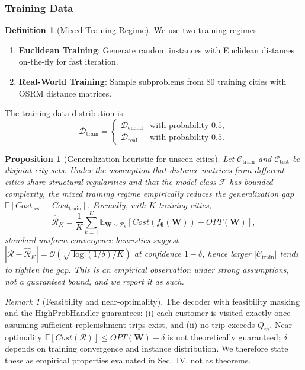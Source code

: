 \documentclass[journal,twoside,web]{ieeecolor}
\newtheorem{proposition}[theorem]{Proposition}
\theoremstyle{definition}
\newtheorem{definition}[theorem]{Definition}
\theoremstyle{remark}
\newtheorem{remark}[theorem]{Remark}
\theoremstyle{definition}
\begin{document}
\subsubsection{Training Data}
\begin{definition}[Mixed Training Regime]
We use two training regimes:
\begin{enumerate}
    \item \textbf{Euclidean Training}: Generate random instances with Euclidean distances on-the-fly for fast iteration.
    \item \textbf{Real-World Training}: Sample subproblems from 80 training cities with OSRM distance matrices.
\end{enumerate}
The training data distribution is:
\begin{equation}
\mathcal{D}_{\text{train}} = \begin{cases}
\mathcal{D}_{\text{euclid}} & \text{with probability } 0.5, \\
\mathcal{D}_{\text{real}} & \text{with probability } 0.5.
\end{cases}
\end{equation}
\end{definition}

\begin{proposition}[Generalization heuristic for unseen cities]
Let $\mathcal{C}_{\text{train}}$ and $\mathcal{C}_{\text{test}}$ be disjoint city sets. \emph{Under the assumption} that distance matrices from different cities share structural regularities and that the model class $\mathcal{F}$ has bounded complexity, the mixed training regime empirically reduces the generalization gap $\mathbb{E}[Cost_{\text{test}}-Cost_{\text{train}}]$. Formally, with $K$ training cities,
\begin{equation}
\hat{\mathcal{R}}_K = \frac{1}{K} \sum_{k=1}^K \mathbb{E}_{\mathbf{W} \sim \mathcal{P}_k} [Cost(f_{\boldsymbol{\theta}}(\mathbf{W})) - OPT(\mathbf{W})],
\end{equation}
standard uniform-convergence heuristics suggest $|\mathcal{R}-\hat{\mathcal{R}}_K|=\mathcal{O}(\sqrt{\log(1/\delta)/K})$ at confidence $1-\delta$, hence larger $|\mathcal{C}_{\text{train}}|$ tends to tighten the gap. This is an empirical observation under strong assumptions, not a guaranteed bound, and we report it as such.
\end{proposition}

\begin{remark}[Feasibility and near-optimality]
The decoder with feasibility masking and the HighProbHandler guarantees: (i) each customer is visited exactly once assuming sufficient replenishment trips exist, and (ii) no trip exceeds $Q_m$. Near-optimality $\mathbb{E}[Cost(\mathcal{R})]\le OPT(\mathbf{W})+\delta$ is not theoretically guaranteed; $\delta$ depends on training convergence and instance distribution. We therefore state these as empirical properties evaluated in Sec.~IV, not as theorems.
\end{remark}
\end{document}
